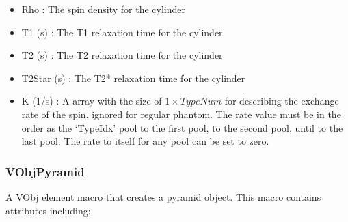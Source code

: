 \documentclass{book}%
\begin{document}
\begin{itemize}
\begin{itemize}
		\item Rho : The spin density for the cylinder
		\item T1 (s) : The T1 relaxation time for the cylinder
		\item T2 (s) : The T2 relaxation time for the cylinder
		\item T2Star (s) : The T2* relaxation time for the cylinder
		\item K (1/s) : A array with the size of $1 \times TypeNum$ for describing the exchange rate of the spin, ignored for regular phantom. The rate value must be in the order as the `TypeIdx' pool to the first pool, to the second pool, until to the last pool. The rate to itself for any pool can be set to zero.
	\end{itemize}
\end{itemize}


\subsubsection{VObjPyramid}

A VObj element macro that creates a pyramid object. This macro contains attributes including:
\end{document}

